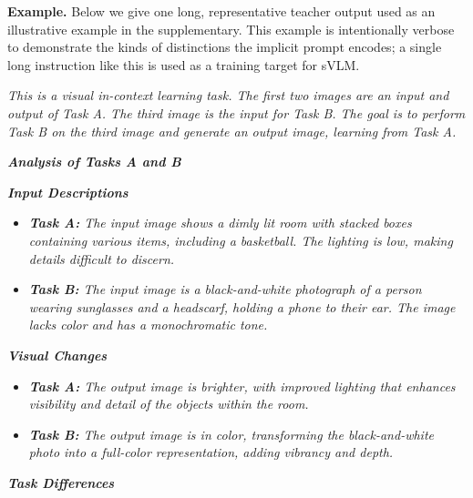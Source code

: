 \noindent \textbf{Example.}
Below we give one long, representative teacher output used as an illustrative example in the supplementary. This example is intentionally verbose to demonstrate the kinds of distinctions the implicit prompt encodes; a single long instruction like this is used as a training target for sVLM.

\begin{tcolorbox}[colback=gray!20, colframe=gray!20, boxrule=0pt, left=3pt, right=3pt, top=3pt, bottom=3pt]

\emph{This is a visual in-context learning task. The first two images are an input and output of Task A. The third image is the input for Task B. The goal is to perform Task B on the third image and generate an output image, learning from Task A.}
\vspace{1pt}

\emph{\textbf{Analysis of Tasks A and B}}

\emph{\textbf{Input Descriptions}}

\begin{itemize}

\item \emph{\textbf{Task A:} The input image shows a dimly lit room with stacked boxes containing various items, including a basketball. The lighting is low, making details difficult to discern.}

\item \emph{\textbf{Task B:} The input image is a black-and-white photograph of a person wearing sunglasses and a headscarf, holding a phone to their ear. The image lacks color and has a monochromatic tone.}

\end{itemize}

\emph{\textbf{Visual Changes}}

\begin{itemize}

\item \emph{\textbf{Task A:} The output image is brighter, with improved lighting that enhances visibility and detail of the objects within the room.}

\item \emph{\textbf{Task B:} The output image is in color, transforming the black-and-white photo into a full-color representation, adding vibrancy and depth.}

\end{itemize}

\emph{\textbf{Task Differences}}


\end{tcolorbox}

